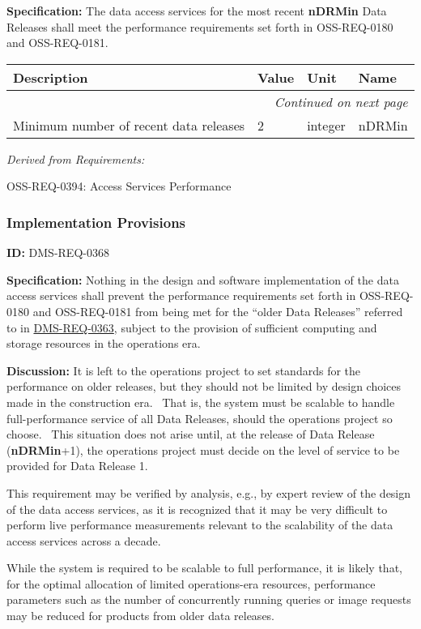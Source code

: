\documentclass[SE,toc,lsstdraft]{lsstdoc}
\makeatletter
\newcommand{\paramname}[1]{\hspace{0pt}#1}
\newcommand{\unitname}[1]{\hspace{0pt}#1}
\newenvironment{parameters}[0]{%
\setlength\LTleft{0pt}
\setlength\LTright{\fill}
\begin{small}
\begin{longtable}[]{|p{0.49\textwidth}|l|p{0.6in}|p{1.70in}@{}|}

\hline \textbf{Description} & \textbf{Value} & \textbf{Unit} & \textbf{Name} \\ \hline
\endhead

\hline \multicolumn{4}{r}{\emph{Continued on next page}} \\
\endfoot

\hline\hline
\endlastfoot
}{%
\hline
\end{longtable}
\end{small}
}
\makeatother
\begin{document}
\textbf{Specification:}
The data access services for the most recent \textbf{nDRMin} Data Releases shall meet the performance requirements set forth in OSS-REQ-0180 and OSS-REQ-0181.

\begin{parameters}
Minimum number of recent data releases
&
2
&
\unitname{%
integer
}
&
\paramname{%
nDRMin
} \\\hline
\end{parameters}

\emph{Derived from Requirements:}

OSS-REQ-0394:
Access Services Performance \newline

\subsubsection{Implementation Provisions}

\label{DMS-REQ-0368}
\textbf{ID:} DMS-REQ-0368

\textbf{Specification:}
Nothing in the design and software implementation of the data access services shall prevent the performance requirements set forth in OSS-REQ-0180 and OSS-REQ-0181 from being met for the “older Data Releases” referred to in \hyperref[DMS-REQ-0363]{DMS-REQ-0363}, subject to the provision of sufficient computing and storage resources in the operations era.

\textbf{Discussion:}
It is left to the operations project to set standards for the performance on older releases, but they should not be limited by design choices made in the construction era.  That is, the system must be scalable to handle full-performance service of all Data Releases, should the operations project so choose.  This situation does not arise until, at the release of Data Release (\textbf{nDRMin}+1), the operations project must decide on the level of service to be provided for Data Release 1.

This requirement may be verified by analysis, e.g., by expert review of the design of the data access services, as it is recognized that it may be very difficult to perform live performance measurements relevant to the scalability of the data access services across a decade.

While the system is required to be scalable to full performance, it is likely that, for the optimal allocation of limited operations-era resources, performance parameters such as the number of concurrently running queries or image requests may be reduced for products from older data releases.
\end{document}
